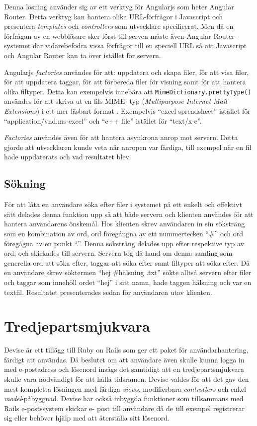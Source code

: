 Denna lösning använder sig av ett verktyg för Angularjs som heter Angular
Router. Detta verktyg kan hantera olika URL-förfrågor i Javascript och
presentera \emph{templates} och \emph{controllers} som utvecklare specificerat.
Men då en förfrågan av en webbläsare sker först till serven måste även Angular
Router-systemet där vidarebefodra vissa förfrågor till en speciell URL så att
Javascript och Angular Router kan ta över istället för servern.

Angularjs \emph{factories} användes för att: uppdatera och skapa filer, för att visa
filer, för att uppdatera taggar, för att förbereda filer för visning samt för
att hantera olika filtyper. Detta kan exempelvis innebära att
\texttt{MimeDictionary.prettyType()} användes för att skriva ut en fils MIME-
typ (\emph{Multipurpose Internet Mail Extensions}) i ett mer läsbart format
\cite{mime}. Exempelvis ``excel spreadsheet'' istället för
``application/vnd.ms-excel'' och ``c++ file'' istället för ``text/x-c''.

\emph{Factories} användes även för att hantera asynkrona anrop mot servern.
Detta gjorde att utvecklaren kunde veta när anropen var färdiga, till exempel
när en fil hade uppdaterats och vad resultatet blev.

\subsection{Sökning}

För att låta en användare söka efter filer i systemet på ett enkelt och
effektivt sätt delades denna funktion upp så att både servern och klienten
användes för att hantera användarens önskemål. Hos klienten skrev användaren in
sin söksträng som en kombination av ord, ord föregångna av ett nummertecken
``\#'' och ord föregågna av en punkt ``.''. Denna söksträng delades upp efter
respektive typ av ord, och skickades till servern. Servern tog då hand om denna
samling som generella ord att söka efter, taggar att söka efter samt filtyper
att söka efter. Då en användare skrev söktermen ``hej \#hälsning .txt'' sökte
alltså servern efter filer och taggar som innehöll ordet ``hej'' i sitt namn,
hade taggen hälsning och var en textfil. Resultatet presenterades sedan för
användaren utav klienten.

\section{Tredjepartsmjukvara}

Devise är ett tillägg till Ruby on Rails som ger ett paket för
användarhantering, färdigt att användas. Då beslutet om att användare även
skulle kunna logga in med e-postadress och lösenord insågs det samtidigt att en
tredjepartsmjukvara skulle vara nödvändigt för att hålla tidsramen. Devise
valdes för att det gav den mest kompletta lösningen med färdiga \emph{views},
modifierbara \emph{controllers} och enkel \emph{model}-påbyggnad. Devise har
också inbyggda funktioner som tillsammans med Rails e-postssystem skickar e-
post till användare då de till exempel registrerar sig eller behöver hjälp med
att återställa sitt lösenord.

